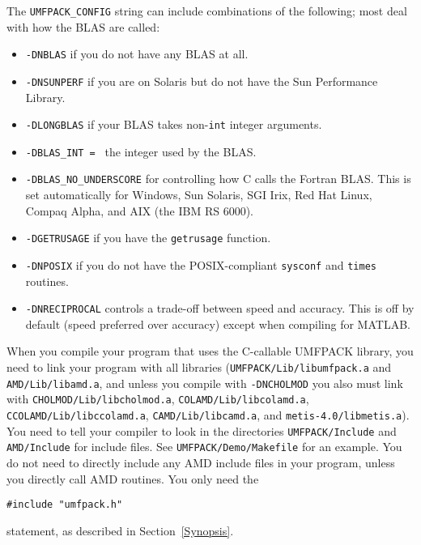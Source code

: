 \documentclass[11pt]{article}
\begin{document}
The {\tt UMFPACK\_CONFIG} string can include combinations of the following;
most deal with how the BLAS are called:
\begin{itemize}
\item {\tt -DNBLAS} if you do not have any BLAS at all.
\item {\tt -DNSUNPERF} if you are on Solaris but do not have the Sun
    Performance Library.
\item {\tt -DLONGBLAS} if your BLAS takes non-{\tt int} integer arguments.
\item {\tt -DBLAS\_INT = } the integer used by the BLAS.

\item {\tt -DBLAS\_NO\_UNDERSCORE}
    for controlling how C calls the Fortran BLAS.
    This is set automatically for Windows,
    Sun Solaris, SGI Irix, Red Hat Linux, Compaq Alpha, and
    AIX (the IBM RS 6000).

\item {\tt -DGETRUSAGE} if you have the {\tt getrusage} function.
\item {\tt -DNPOSIX} if you do not have the POSIX-compliant
    {\tt sysconf} and {\tt times} routines.
\item {\tt -DNRECIPROCAL} controls a trade-off between speed and accuracy.
    This is off by default (speed preferred over accuracy) except when
    compiling for MATLAB.
\end{itemize}

When you compile your program that uses the C-callable UMFPACK library,
you need to link your program with all libraries
({\tt UMFPACK/Lib/libumfpack.a} and {\tt AMD/Lib/libamd.a},
and unless you compile with \verb'-DNCHOLMOD' you also must link with
{\tt CHOLMOD/Lib/libcholmod.a}, \newline
{\tt COLAMD/Lib/libcolamd.a},
{\tt CCOLAMD/Lib/libccolamd.a},
{\tt CAMD/Lib/libcamd.a},
and \newline
{\tt metis-4.0/libmetis.a}).
You need to tell your compiler to look in the
directories {\tt UMFPACK/Include} and {\tt AMD/Include} for include
files.  See {\tt UMFPACK/Demo/Makefile} for an example.
You do not need to directly include any AMD include files in your
program, unless you directly call AMD routines.  You only need the
\begin{verbatim}
#include "umfpack.h"
\end{verbatim}
statement, as described in Section~\ref{Synopsis}.

\newpage
\end{document}
